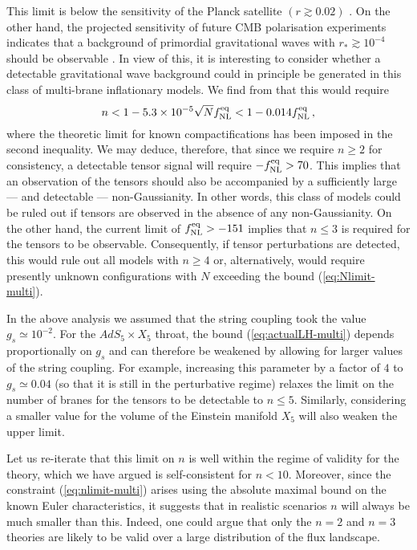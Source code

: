 This limit is below the sensitivity of the Planck satellite 
$(r \gtrsim 0.02 )$ \cite{planck}. On the other hand, 
the projected sensitivity of future CMB polarisation experiments 
indicates that a background of primordial 
gravitational waves with $r_* \gtrsim 10^{-4}$ 
should be observable \cite{songknox,vpj, Baumann:2008aq}. In view of this, 
it is interesting to consider whether
a detectable gravitational wave background could in principle 
be generated in this class of multi-brane inflationary 
models. We find from  that this would require 
% 
\begin{equation}
\label{eq:nlimit-multi}
n < 1 -5.3 \times 10^{-5} \sqrt{N} f_{\mathrm{NL}}^{\mathrm{eq}} < 1-0.014 f_{\mathrm{NL}}^{\mathrm{eq}} \,,
\end{equation}
% 
where the theoretic limit  for 
known compactifications has been imposed in the 
second inequality. We may deduce, therefore, that  
since we require $n \ge 2$ for consistency, a detectable tensor 
signal will require $-f_{\mathrm{NL}}^{\mathrm{eq}} >70$. This implies that an observation of 
the tensors should also be 
accompanied by a sufficiently large --- and detectable --- non-Gaussianity. 
In other words, this class of models could  
be ruled out if tensors are observed in the absence of any
non-Gaussianity. On the other hand, the current 
limit of  $f_{\mathrm{NL}}^{\mathrm{eq}} >-151$ implies that $n \le 3$ is required 
for the tensors to be observable. 
Consequently, if tensor perturbations are detected, this would rule 
out all models with $n \ge  4$ or, alternatively, would require presently 
unknown configurations with $N$ exceeding the bound (\ref{eq:Nlimit-multi}). 


In the above analysis we assumed that the string coupling 
took the value $g_s \simeq 10^{-2}$. For the $AdS_5 \times X_5$ throat, 
the bound (\ref{eq:actualLH-multi}) depends proportionally on $g_s$ and can 
therefore be weakened by allowing for larger values of the string coupling. 
For example, increasing this parameter by a factor of $4$ 
to $g_s \simeq 0.04$ (so that it is still in the perturbative regime)
relaxes the limit on the number of branes for the tensors to be detectable to 
$n \le 5$. Similarly, considering a smaller value for the 
volume of the Einstein manifold $X_5$ will also weaken the upper limit. 


Let us re-iterate that this limit on $n$ is well within the 
regime of validity for the theory, which we have argued is 
self-consistent for $n<10$. Moreover, since the constraint (\ref{eq:nlimit-multi})
arises using the absolute maximal bound on the known 
Euler characteristics, it suggests that in realistic scenarios $n$ will 
always be much smaller than this. Indeed, one could argue that 
only the $n=2$ and $n=3$ theories are
likely to be valid over a large distribution of the flux landscape. 


